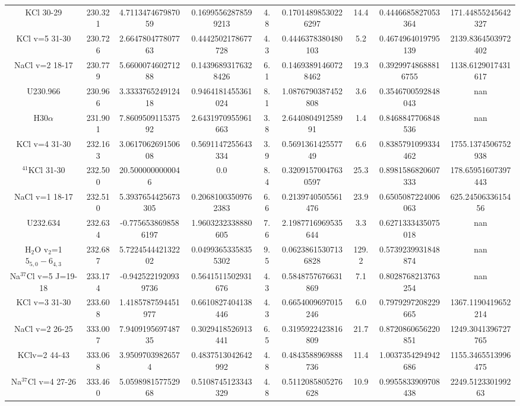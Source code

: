 \begin{table*}[htp]
\begin{tabular}{ccccccccc}
KCl 30-29 & 230.321 & 4.711347467987059 & 0.16995562878599213 & 4.8 & 0.17014898530226297 & 14.4 & 0.4446685827053364 & 171.44855245642327 \\
KCl v=5 31-30 & 230.726 & 2.664780477807763 & 0.4442502178677728 & 4.3 & 0.4446378380480103 & 5.2 & 0.4674964019795139 & 2139.8364503972402 \\
NaCl v=2 18-17 & 230.779 & 5.660007460271288 & 0.14396893176328426 & 6.1 & 0.14693891460728462 & 19.3 & 0.39299748688816755 & 1138.6129017431617 \\
U230.966 & 230.966 & 3.333376524912418 & 0.9464181455361024 & 8.1 & 1.0876790387452808 & 3.6 & 0.3546700592848043 & nan \\
H30$\alpha$ & 231.901 & 7.860950911537592 & 2.6431970955961663 & 3.8 & 2.644080491258991 & 1.4 & 0.8468847706848536 & nan \\
KCl v=4 31-30 & 232.163 & 3.061706269150608 & 0.5691147255643334 & 3.9 & 0.569136142557749 & 6.6 & 0.8385791099334462 & 1755.1374506752938 \\
$^{41}$KCl 31-30 & 232.500 & 20.5000000000046 & 0.0 & 8.4 & 0.32091570047630597 & 25.3 & 0.8981586820607333 & 178.65951607397443 \\
NaCl v=1 18-17 & 232.510 & 5.3937654425673305 & 0.20681003509762383 & 6.6 & 0.2139740505561476 & 23.9 & 0.6505087224006063 & 625.2450633615456 \\
U232.634 & 232.634 & -0.7756538698586197 & 1.9603232338880605 & 7.6 & 2.1987716969535644 & 3.3 & 0.6271333435075018 & nan \\
H$_2$O v$_2$=1 $5_{5,0}-6_{4,3}$ & 232.687 & 5.722454442132202 & 0.04993653358355302 & 9.5 & 0.06238615307136828 & 129.2 & 0.5739239931848874 & nan \\
Na$^{37}$Cl v=5 J=19-18 & 233.174 & -0.9425221920939736 & 0.5641511502931676 & 4.3 & 0.5848757676631869 & 7.1 & 0.8028768213763254 & nan \\
KCl v=3 31-30 & 233.608 & 1.4185787594451977 & 0.6610827404138446 & 4.3 & 0.6654009697015246 & 6.0 & 0.7979297208229665 & 1367.1190419652214 \\
NaCl v=2 26-25 & 333.007 & 7.940919569748735 & 0.3029418526913441 & 6.5 & 0.3195922423816809 & 21.7 & 0.8720860656220851 & 1249.3041396727765 \\
KClv=2 44-43 & 333.068 & 3.95097039826574 & 0.4837513042642992 & 4.8 & 0.4843588969888736 & 11.4 & 1.0037354294942686 & 1155.3465513996475 \\
Na$^{37}$Cl v=4 27-26 & 333.460 & 5.059898157752968 & 0.5108745123343329 & 4.8 & 0.5112085805276628 & 10.9 & 0.9955833909708438 & 2249.512330199263 \\

\end{tabular}
\end{table*}
